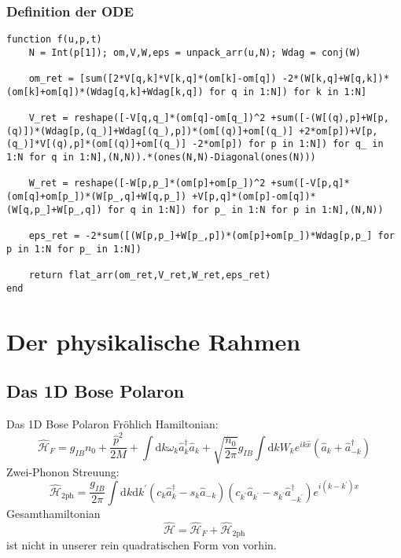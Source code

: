\documentclass{beamer}
\newcommand{\CR}{\hat a^\dagger}
\newcommand{\AN}{\hat a}
\newcommand{\ham}{\hat{\mathcal{H}}}
\begin{document}
\begin{frame}[fragile]

\frametitle{Definition der ODE}

\begin{verbatim}
function f(u,p,t)
    N = Int(p[1]); om,V,W,eps = unpack_arr(u,N); Wdag = conj(W)

    om_ret = [sum([2*V[q,k]*V[k,q]*(om[k]-om[q]) -2*(W[k,q]+W[q,k])*(om[k]+om[q])*(Wdag[q,k]+Wdag[k,q]) for q in 1:N]) for k in 1:N]

    V_ret = reshape([-V[q,q_]*(om[q]-om[q_])^2 +sum([-(W[(q),p]+W[p,(q)])*(Wdag[p,(q_)]+Wdag[(q_),p])*(om[(q)]+om[(q_)] +2*om[p])+V[p,(q_)]*V[(q),p]*(om[(q)]+om[(q_)] -2*om[p]) for p in 1:N]) for q_ in 1:N for q in 1:N],(N,N)).*(ones(N,N)-Diagonal(ones(N)))

    W_ret = reshape([-W[p,p_]*(om[p]+om[p_])^2 +sum([-V[p,q]*(om[q]+om[p_])*(W[p_,q]+W[q,p_]) +V[p,q]*(om[p]-om[q])*(W[q,p_]+W[p_,q]) for q in 1:N]) for p_ in 1:N for p in 1:N],(N,N))

    eps_ret = -2*sum([(W[p,p_]+W[p_,p])*(om[p]+om[p_])*Wdag[p,p_] for p in 1:N for p_ in 1:N])

    return flat_arr(om_ret,V_ret,W_ret,eps_ret) 
end
\end{verbatim}


\end{frame}

\section{Der physikalische Rahmen}
\subsection{Das 1D Bose Polaron}
\begin{frame}[allowframebreaks]{Das 1D Bose Polaron}
Fröhlich Hamiltonian:
$$
\ham_F = g_{IB}n_0+\frac{\hat p^2}{2M}+\int\mathrm d k\omega_{ k}\CR_{ k}\AN_{ k}+\sqrt{\frac{n_0}{2\pi}}g_{IB}\int\mathrm d k W_k e^{ik\hat x}\left(\AN_{ k}+\CR_{- k}\right)
$$
Zwei-Phonon Streuung:
$$
\ham_{2\mathrm{ph}}=\frac{g_{IB}}{2\pi}\int\mathrm d k\mathrm d k^\prime \left(c_k\CR_k-s_k\AN_{-k}\right)\left(c_{k^\prime}\AN_{k^\prime}-s_{k^\prime}\CR_{-k^\prime}\right)e^{i(k-k^\prime)x}
$$
Gesamthamiltonian
$$
\ham = \ham_F + \ham_{2\mathrm{ph}}
$$
ist nicht in unserer rein quadratischen Form von vorhin.
\end{frame}
\end{document}
